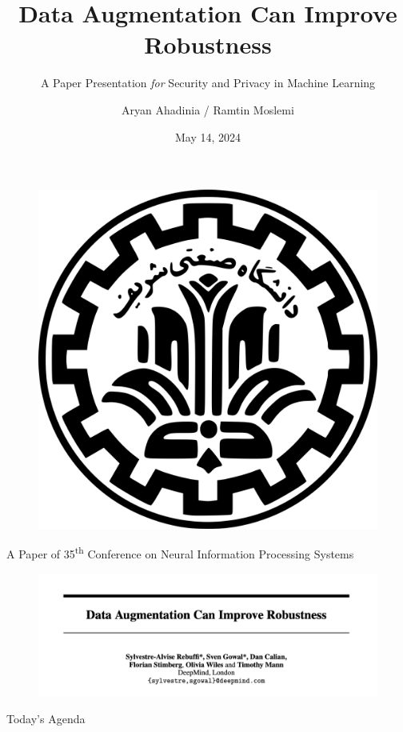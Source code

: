 \documentclass[8pt]{beamer} %
\author{Aryan Ahadinia / Ramtin Moslemi}
\title{Data Augmentation Can Improve Robustness}
\subtitle{A Paper Presentation \textit{for} Security and Privacy in Machine Learning}
\institute{Department of Computer Engineering, Sharif University of Technology}
\date{May 14, 2024}
\begin{document}
\begin{frame}
    \begin{figure}[htpb]
        \begin{center}
            \includegraphics[keepaspectratio, scale=0.025]{pic/sut-logo.png}
        \end{center}
    \end{figure}
    \titlepage
    \vspace*{-0.6cm}
\end{frame}

\begin{frame}{A Paper of 35\textsuperscript{th} Conference on Neural Information Processing Systems}
    \begin{figure}
        \centering
        \includegraphics[width=\linewidth]{pic/Title.png}
        \label{fig:title}
    \end{figure}
\end{frame}

\begin{frame}{Today's Agenda}
    \tableofcontents[sectionstyle=show,
    subsectionstyle=show/shaded/hide,
    subsubsectionstyle=show/shaded/hide]
\end{frame}








\end{document}

